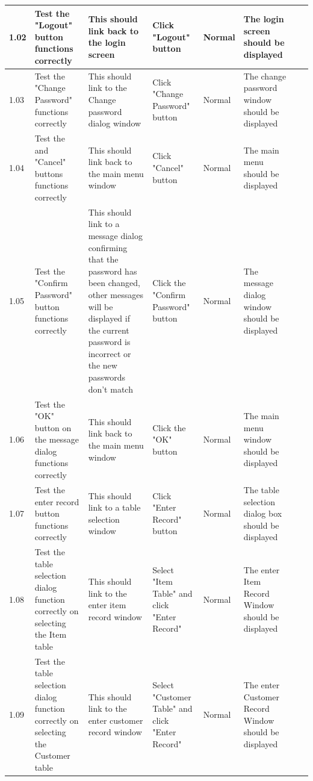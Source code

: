 \begin{landscape}
\begin{center}
\begin{longtable}{|p{1.5cm}|p{2cm}|p{3cm}|p{2cm}|p{2cm}|p{2.5cm}|p{2cm}|p{2cm}|}
        1.02 & Test the "Logout" button functions correctly & This should link back to the login screen & Click "Logout" button & Normal & The login screen should 
        be displayed & & \\ \hline
        
        1.03 & Test the "Change Password" functions correctly & This should link to the Change password dialog window & Click "Change Password" button & Normal & The 
        change password window should be displayed & & \\ \hline
        
        1.04 & Test the and "Cancel" buttons functions correctly & This should link back to the main menu window & Click "Cancel" button & Normal & The main menu should 
        be displayed & & \\ \hline
        
        1.05 & Test the "Confirm Password" button functions correctly & This should link to a message dialog confirming that the password has been changed, other 
        messages will be displayed if the current password is incorrect or the new passwords don't match & Click the "Confirm Password" button & Normal & The message 
        dialog window should be displayed & & \\ \hline
        
        1.06 & Test the "OK" button on the message dialog functions correctly & This should link back to the main menu window & Click the "OK" button & Normal & The 
        main menu window should be displayed & & \\ \hline
        
        1.07 & Test the enter record button functions correctly & This should link to a table selection window & Click "Enter Record" button & Normal & The table
        selection dialog box should be displayed & & \\ \hline 
        
        1.08 & Test the table selection dialog function correctly on selecting the Item table & This should link to the enter item record window & Select "Item Table" 
        and click "Enter Record" & Normal & The enter Item Record Window should be displayed & & \\ \hline
        
        1.09 & Test the table selection dialog function correctly on selecting the Customer table & This should link to the enter customer record window & Select 
        "Customer Table" and click "Enter Record" & Normal & The enter Customer Record Window should be displayed & & \\ \hline


\end{longtable}
\end{center}
\end{landscape}
